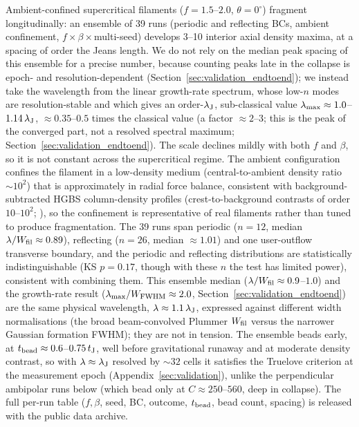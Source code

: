 \documentclass[usenatbib,twoside,twocolumn]{mnras}
\begin{document}
Ambient-confined supercritical filaments ($f=1.5$--$2.0$, $\theta=0^\circ$) fragment longitudinally: an ensemble of 39 runs (periodic and reflecting BCs, ambient confinement, $f\times\beta\times$multi-seed) develops 3--10 interior axial density maxima, at a spacing of order the Jeans length. We do not rely on the median peak spacing of this ensemble for a precise number, because counting peaks late in the collapse is epoch- and resolution-dependent (Section~\ref{sec:validation_endtoend}); we instead take the wavelength from the linear growth-rate spectrum, whose low-$n$ modes are resolution-stable and which gives an order-$\lambda_{\rm J}$, sub-classical value $\lambda_{\rm max}\approx1.0$--$1.14\,\lambda_{\rm J}$, $\approx0.35$--$0.5$ times the classical value (a factor $\approx2$--$3$; this is the peak of the converged part, not a resolved spectral maximum; Section~\ref{sec:validation_endtoend}). The scale declines mildly with both $f$ and $\beta$, so it is not constant across the supercritical regime. The ambient configuration confines the filament in a low-density medium (central-to-ambient density ratio $\sim10^2$) that is approximately in radial force balance, consistent with background-subtracted HGBS column-density profiles (crest-to-background contrasts of order $10$--$10^2$; \citealt{Arzoumanian2019}), so the confinement is representative of real filaments rather than tuned to produce fragmentation. The 39 runs span periodic ($n=12$, median $\lambda/W_{\rm fil}\approx0.89$), reflecting ($n=26$, median $\approx1.01$) and one user-outflow transverse boundary, and the periodic and reflecting distributions are statistically indistinguishable (KS $p=0.17$, though with these $n$ the test has limited power), consistent with combining them. This ensemble median ($\lambda/W_{\rm fil}\approx0.9$--$1.0$) and the growth-rate result ($\lambda_{\rm max}/W_{\rm FWHM}\approx2.0$, Section~\ref{sec:validation_endtoend}) are the same physical wavelength, $\lambda\approx1.1\,\lambda_{\rm J}$, expressed against different width normalisations (the broad beam-convolved Plummer $W_{\rm fil}$ versus the narrower Gaussian formation FWHM); they are not in tension. The ensemble beads early, at $t_{\rm bead}\approx0.6$--$0.75\,t_{\rm J}$, well before gravitational runaway and at moderate density contrast, so with $\lambda\approx\lambda_{\rm J}$ resolved by ${\sim}32$ cells it satisfies the Truelove criterion at the measurement epoch (Appendix~\ref{sec:validation}), unlike the perpendicular ambipolar runs below (which bead only at $C\approx250$--$560$, deep in collapse). The full per-run table ($f,\beta$, seed, BC, outcome, $t_{\rm bead}$, bead count, spacing) is released with the public data archive.
\end{document}

